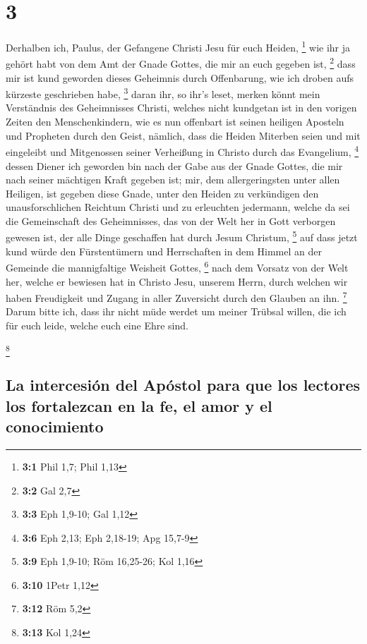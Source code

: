 \hypertarget{section-2}{%
\section{3}\label{section-2}}

 Derhalben ich, Paulus, der Gefangene Christi Jesu für
euch Heiden, \footnote{\textbf{3:1} Phil 1,7; Phil 1,13} 
wie ihr ja gehört habt von dem Amt der Gnade Gottes, die mir an euch
gegeben ist, \footnote{\textbf{3:2} Gal 2,7}  dass mir ist
kund geworden dieses Geheimnis durch Offenbarung, wie ich droben aufs
kürzeste geschrieben habe, \footnote{\textbf{3:3} Eph 1,9-10; Gal 1,12}
 daran ihr, so ihr's leset, merken könnt mein Verständnis
des Geheimnisses Christi,  welches nicht kundgetan ist in
den vorigen Zeiten den Menschenkindern, wie es nun offenbart ist seinen
heiligen Aposteln und Propheten durch den Geist,  nämlich,
dass die Heiden Miterben seien und mit eingeleibt und Mitgenossen seiner
Verheißung in Christo durch das Evangelium, \footnote{\textbf{3:6} Eph
  2,13; Eph 2,18-19; Apg 15,7-9}  dessen Diener ich
geworden bin nach der Gabe aus der Gnade Gottes, die mir nach seiner
mächtigen Kraft gegeben ist;  mir, dem allergeringsten
unter allen Heiligen, ist gegeben diese Gnade, unter den Heiden zu
verkündigen den unausforschlichen Reichtum Christi  und zu
erleuchten jedermann, welche da sei die Gemeinschaft des Geheimnisses,
das von der Welt her in Gott verborgen gewesen ist, der alle Dinge
geschaffen hat durch Jesum Christum, \footnote{\textbf{3:9} Eph 1,9-10;
  Röm 16,25-26; Kol 1,16}  auf dass jetzt kund würde den
Fürstentümern und Herrschaften in dem Himmel an der Gemeinde die
mannigfaltige Weisheit Gottes, \footnote{\textbf{3:10} 1Petr 1,12}
 nach dem Vorsatz von der Welt her, welche er bewiesen
hat in Christo Jesu, unserem Herrn,  durch welchen wir
haben Freudigkeit und Zugang in aller Zuversicht durch den Glauben an
ihn. \footnote{\textbf{3:12} Röm 5,2}  Darum bitte ich,
dass ihr nicht müde werdet um meiner Trübsal willen, die ich für euch
leide, welche euch eine Ehre sind.

\footnote{\textbf{3:13} Kol 1,24}

\hypertarget{la-intercesiuxf3n-del-apuxf3stol-para-que-los-lectores-los-fortalezcan-en-la-fe-el-amor-y-el-conocimiento}{%
\subsection{La intercesión del Apóstol para que los lectores los
fortalezcan en la fe, el amor y el
conocimiento}\label{la-intercesiuxf3n-del-apuxf3stol-para-que-los-lectores-los-fortalezcan-en-la-fe-el-amor-y-el-conocimiento}}

